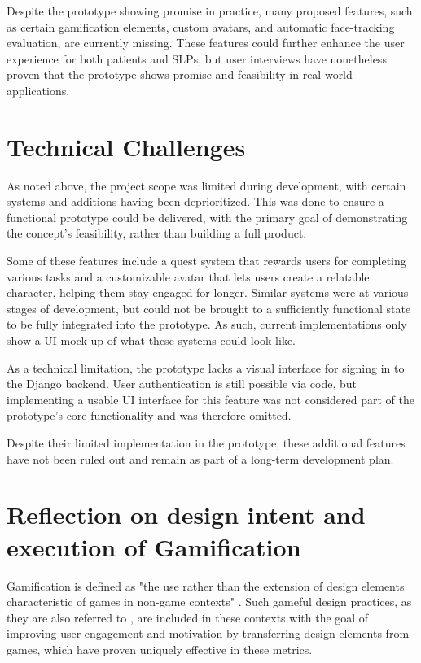 Despite the prototype showing promise in practice, many proposed features, such as certain gamification elements, custom avatars, and automatic face-tracking evaluation, are currently missing. These features could further enhance the user experience for both patients and SLPs, but user interviews have nonetheless proven that the prototype shows promise and feasibility in real-world applications. 


\section{Technical Challenges}
\label{sec:technical-challenges}

As noted above, the project scope was limited during development, with certain systems and additions having been deprioritized. This was done to ensure a functional prototype could be delivered, with the primary goal of demonstrating the concept's feasibility, rather than building a full product.

Some of these features include a quest system that rewards users for completing various tasks and a customizable avatar that lets users create a relatable character, helping them stay engaged for longer. Similar systems were at various stages of development, but could not be brought to a sufficiently functional state to be fully integrated into the prototype. As such, current implementations only show a UI mock-up of what these systems could look like.

As a technical limitation, the prototype lacks a visual interface for signing in to the Django backend. User authentication is still possible via code, but implementing a usable UI interface for this feature was not considered part of the prototype's core functionality and was therefore omitted.

Despite their limited implementation in the prototype, these additional features have not been ruled out and remain as part of a long-term development plan.

\section{Reflection on design intent and execution of Gamification}
\label{sec:reflection-on-gamification-as-a-design-lens}

Gamification is defined as "the use rather than the extension of design elements characteristic of games in non-game contexts" \cite{deterding2011game}. Such gameful design practices, as they are also referred to \cite{deterding2011game}, are included in these contexts with the goal of improving user engagement and motivation by transferring design elements from games, which have proven uniquely effective in these metrics.

